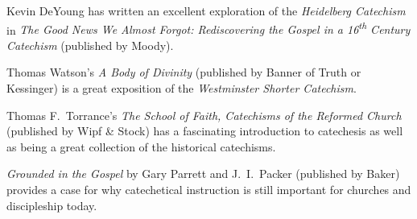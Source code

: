 Kevin DeYoung has written an excellent exploration of the \emph{Heidelberg Catechism}\/ in \emph{The Good News We Almost Forgot: Rediscovering the Gospel\/ in a 16\textsuperscript{th} Century Catechism}\/ (published by Moody).

Thomas Watson's \emph{A Body of Divinity}\/ (published by Banner of Truth or Kessinger) is a great exposition of the \emph{Westminster Shorter Catechism}.

Thomas F.\ Torrance's \emph{The School of Faith, Catechisms of the Reformed Church}\/ (published by Wipf \& Stock) has a fascinating introduction to catechesis as well as being a great collection of the historical catechisms.

\emph{Grounded in the Gospel}\/ by Gary Parrett and J.~I.\ Packer (published by Baker) provides a case for why catechetical instruction is still important for churches and discipleship today.

\cleardoublepage


